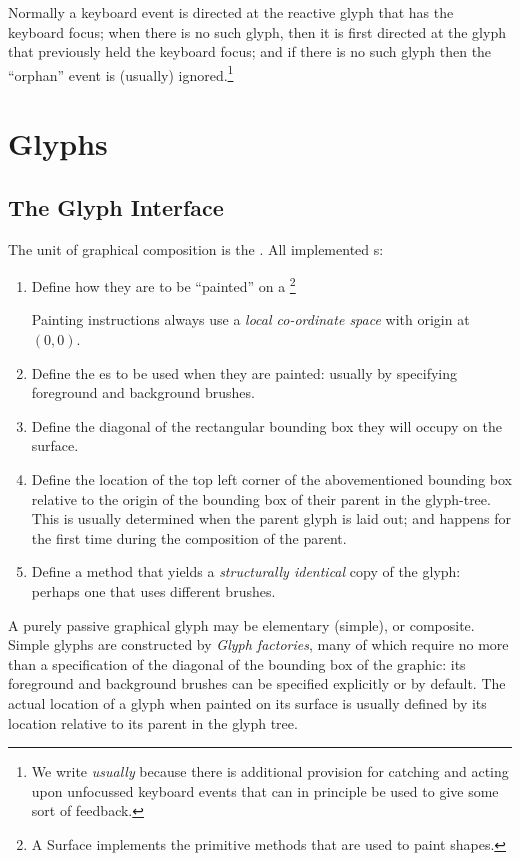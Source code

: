 \documentclass[12pt,a4paper]{article}
\def\S#1{\section{#1}}
\def\SS#1{\subsection{#1}}
\begin{document}
Normally a keyboard event is directed at the reactive glyph that
has the keyboard focus; when there is no such glyph, then it is
first directed at the glyph that previously held the keyboard focus;
and if there is no such glyph then the ``orphan'' event is (usually)
ignored.\footnote{We write \textit{usually} because there is
additional provision for catching and acting upon unfocussed keyboard
events that can in principle be used to give some sort of feedback.}



\clearpage
\S{Glyphs}
\SS{The Glyph Interface}

The unit of graphical composition is the . All implemented s:

\begin{enumerate}
        \item Define how they are to be ``painted'' on a
        \footnote{A Surface
        implements the primitive methods that are used to paint
        shapes.}
        
        Painting instructions always use a \textit{local co-ordinate space}
        with origin at $(0,0)$. 

        \item Define the es to be
        used when they are painted: usually by specifying foreground and
        background brushes.

        \item Define the diagonal of the rectangular bounding box they
        will occupy on the surface.

        \item Define the location of the top left corner of the
        abovementioned bounding box relative to the origin of the
        bounding box of their parent in the glyph-tree. This is
        usually determined when the parent glyph is laid out; and
        happens for the first time during the composition
        of the parent.

        \item Define a method that yields a \textit{structurally identical} copy
        of the glyph: perhaps one that uses different brushes.     
\end{enumerate}

A purely passive graphical glyph may be elementary (simple), or composite. 
Simple glyphs are constructed by \textit{Glyph factories},
many of which require no more than a specification of the
diagonal of the bounding box of the graphic: its foreground and background
brushes can be specified explicitly or by default.
%
The actual location of a glyph when painted on its surface is usually
defined by its location relative to its parent in the glyph tree.
\end{document}

